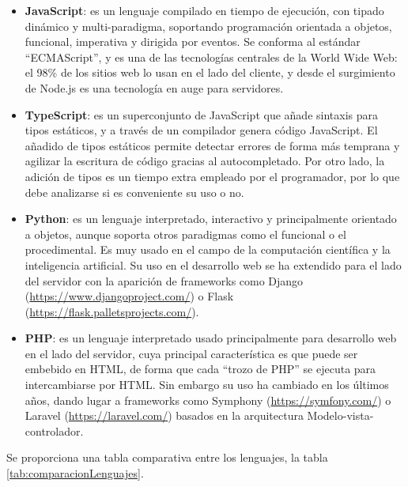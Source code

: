 \begin{itemize}
    \item \textbf{JavaScript}: es un lenguaje compilado en tiempo de ejecución, con tipado dinámico y multi-paradigma, soportando programación orientada a objetos, funcional, imperativa y dirigida por eventos\cite{wiki:JavaScript}. Se conforma al estándar ``ECMAScript'', y es una de las tecnologías centrales de la World Wide Web: el 98\% de los sitios web lo usan en el lado del cliente\cite{javascriptUsage}, y desde el surgimiento de Node.js es una tecnología en auge para servidores.
    \item \textbf{TypeScript}: es un superconjunto de JavaScript que añade sintaxis para tipos estáticos, y a través de un compilador genera código JavaScript\cite{typescriptWeb}. El añadido de tipos estáticos permite detectar errores de forma más temprana y agilizar la escritura de código gracias al autocompletado. Por otro lado, la adición de tipos es un tiempo extra empleado por el programador, por lo que debe analizarse si es conveniente su uso o no.
    \item \textbf{Python}: es un lenguaje interpretado, interactivo y principalmente orientado a objetos, aunque soporta otros paradigmas como el funcional o el procedimental\cite{pythonFAQGeneral}. Es muy usado en el campo de la computación científica y la inteligencia artificial. Su uso en el desarrollo web se ha extendido para el lado del servidor con la aparición de frameworks como Django (\url{https://www.djangoproject.com/}) o Flask (\url{https://flask.palletsprojects.com/}).
    \item \textbf{PHP}: es un lenguaje interpretado usado principalmente para desarrollo web en el lado del servidor, cuya principal característica es que puede ser embebido en HTML, de forma que cada ``trozo de PHP'' se ejecuta para intercambiarse por HTML. Sin embargo su uso ha cambiado en los últimos años, dando lugar a frameworks como Symphony (\url{https://symfony.com/}) o Laravel (\url{https://laravel.com/}) basados en la arquitectura Modelo-vista-controlador.
\end{itemize}

Se proporciona una tabla comparativa entre los lenguajes, la tabla \ref{tab:comparacionLenguajes}.

